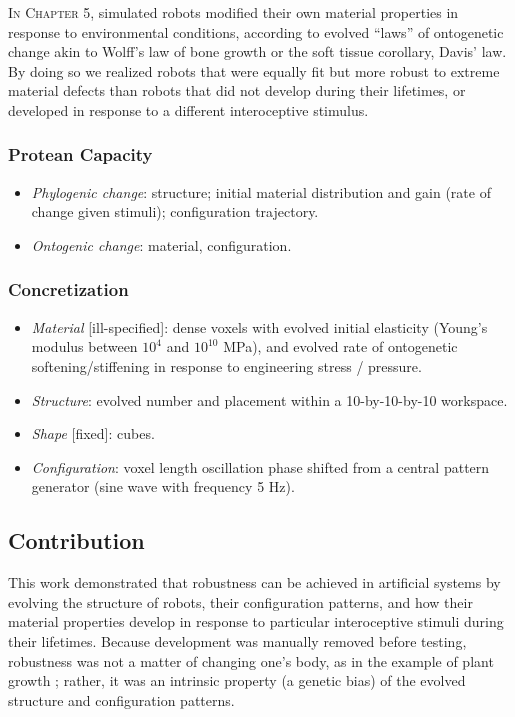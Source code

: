 \textsc{In Chapter 5,}
simulated robots modified their own material properties
in response to environmental conditions,
according to evolved ``laws'' of ontogenetic change akin to Wolff's law of bone growth \cite{wolff1893gesetz} or the soft tissue corollary, Davis' law.
By doing so we realized robots that were equally fit but more robust to extreme material defects than robots that did not develop during their lifetimes, or developed in response to a different interoceptive stimulus.


\subsubsection*{Protean Capacity}

\begin{itemize}
    \item \textit{Phylogenic change}: structure; initial material distribution and gain (rate of change given stimuli); configuration trajectory.
    \item \textit{Ontogenic change}: material, configuration.
\end{itemize}


\subsubsection*{Concretization}


\begin{itemize}
    \item \textit{Material} [ill-specified]: dense voxels with evolved initial elasticity (Young's modulus between $10^4$ and $10^{10}$ MPa), and evolved rate of ontogenetic softening/stiffening in response to engineering stress / pressure.
    \item \textit{Structure}: evolved number and placement within a 10-by-10-by-10 workspace.
    \item \textit{Shape} [fixed]: cubes.
    \item \textit{Configuration}: voxel length oscillation phase shifted from a central pattern generator (sine wave with frequency 5 Hz).
\end{itemize}



\subsection{Contribution}


This work demonstrated that robustness can be achieved in artificial systems by evolving the structure of robots, their configuration patterns, and how
their material properties develop in response to particular interoceptive stimuli during their lifetimes.
Because development was manually removed before testing, robustness was not a matter of changing one's body, as in the example of plant growth \citep{sultan2000phenotypic}; 
rather, it was an intrinsic property (a genetic bias) of the evolved structure and configuration patterns.

